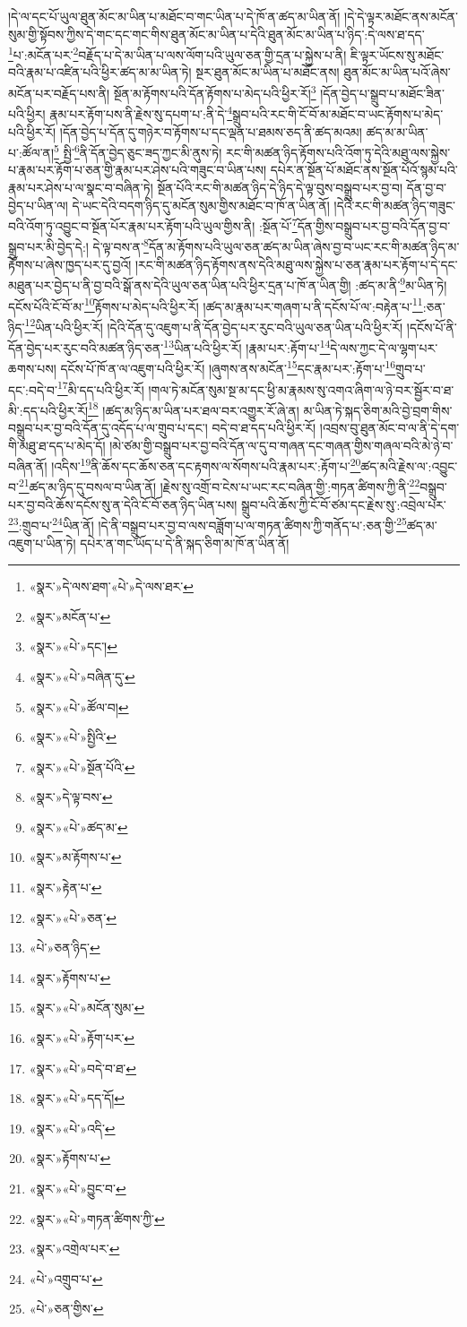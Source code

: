 །དེ་ལ་དང་པོ་ཡུལ་ཐུན་མོང་མ་ཡིན་པ་མཐོང་བ་གང་ཡིན་པ་དེ་ཁོ་ན་ཚད་མ་ཡིན་ནོ། །དེ་དེ་ལྟར་མཐོང་ནས་མངོན་སུམ་གྱི་སྟོབས་ཀྱིས་དེ་གང་དང་གང་གིས་ཐུན་མོང་མ་ཡིན་པ་དེའི་ཐུན་མོང་མ་ཡིན་པ་ཉིད་:དེ་ལས་ཐ་དད་\footnote{«སྣར་»དེ་ལས་ཐག་«པེ་»དེ་ལས་ཐར་}པ་:མངོན་པར་\footnote{«སྣར་»མངོན་པ་}བརྗོད་པ་དེ་མ་ཡིན་པ་ལས་ལོག་པའི་ཡུལ་ཅན་གྱི་དྲན་པ་སྐྱེས་པ་ནི། ཇི་ལྟར་ཡོངས་སུ་མཐོང་བའི་རྣམ་པ་འཛིན་པའི་ཕྱིར་ཚད་མ་མ་ཡིན་ཏེ། སྔར་ཐུན་མོང་མ་ཡིན་པ་མཐོང་ནས། ཐུན་མོང་མ་ཡིན་པའོ་ཞེས་མངོན་པར་བརྗོད་པས་ནི། སྔོན་མ་རྟོགས་པའི་དོན་རྟོགས་པ་མེད་པའི་ཕྱིར་རོ།\footnote{«སྣར་»«པེ་»དང་།} །དོན་བྱེད་པ་སྒྲུབ་པ་མཐོང་ཟིན་པའི་ཕྱིར། རྣམ་པར་རྟོག་པས་ནི་རྗེས་སུ་དཔག་པ་:ནི་དེ་\footnote{«སྣར་»«པེ་»བཞིན་དུ་}སྒྲུབ་པའི་རང་གི་ངོ་བོ་མ་མཐོང་བ་ཡང་རྟོགས་པ་མེད་པའི་ཕྱིར་རོ། །དོན་བྱེད་པ་དོན་དུ་གཉེར་བ་རྟོགས་པ་དང་ལྡན་པ་ཐམས་ཅད་ནི་ཚད་མའམ། ཚད་མ་མ་ཡིན་པ་:ཚོལ་ན།\footnote{«སྣར་»«པེ་»ཚོལ་བ།} སྤྱི་\footnote{«སྣར་»«པེ་»སྤྱིའི་}ནི་དོན་བྱེད་ཅུང་ཟད་ཀྱང་མི་ནུས་ཏེ། རང་གི་མཚན་ཉིད་རྟོགས་པའི་འོག་ཏུ་དེའི་མཐུ་ལས་སྐྱེས་པ་རྣམ་པར་རྟོག་པ་ཅན་གྱི་རྣམ་པར་ཤེས་པའི་གཟུང་བ་ཡིན་པས། དཔེར་ན་སྔོན་པོ་མཐོང་ནས་སྔོན་པོའོ་སྙམ་པའི་རྣམ་པར་ཤེས་པ་ལ་སྣང་བ་བཞིན་ཏེ། སྔོན་པོའི་རང་གི་མཚན་ཉིད་དེ་ཉིད་དེ་ལྟ་བུས་བསྒྲུབ་པར་བྱ་བ། དོན་བྱ་བ་བྱེད་པ་ཡིན་ལ། དེ་ཡང་དེའི་བདག་ཉིད་དུ་མངོན་སུམ་གྱིས་མཐོང་བ་ཁོ་ན་ཡིན་ནོ། །དེའི་རང་གི་མཚན་ཉིད་གཟུང་བའི་འོག་ཏུ་འབྱུང་བ་སྔོན་པོར་རྣམ་པར་རྟོག་པའི་ཡུལ་གྱིས་ནི། :སྔོན་པོ་\footnote{«སྣར་»«པེ་»སྔོན་པོའི་}དོན་གྱིས་བསྒྲུབ་པར་བྱ་བའི་དོན་བྱ་བ་སྒྲུབ་པར་མི་བྱེད་དེ:། དེ་ལྟ་བས་ན་\footnote{«སྣར་»དེ་ལྟ་བས་}དོན་མ་རྟོགས་པའི་ཡུལ་ཅན་ཚད་མ་ཡིན་ཞེས་བྱ་བ་ཡང་རང་གི་མཚན་ཉིད་མ་རྟོགས་པ་ཞེས་ཁྱད་པར་དུ་བྱའོ། །རང་གི་མཚན་ཉིད་རྟོགས་ནས་དེའི་མཐུ་ལས་སྐྱེས་པ་ཅན་རྣམ་པར་རྟོག་པ་དེ་དང་མཐུན་པར་བྱེད་པ་ནི་བྱ་བའི་སྒོ་ནས་དེའི་ཡུལ་ཅན་ཡིན་པའི་ཕྱིར་དྲན་པ་ཁོ་ན་ཡིན་གྱི། :ཚད་མ་ནི་\footnote{«སྣར་»«པེ་»ཚད་མ་}མ་ཡིན་ཏེ། དངོས་པོའི་ངོ་བོ་མ་\footnote{«སྣར་»མ་རྟོགས་པ་}རྟོགས་པ་མེད་པའི་ཕྱིར་རོ། །ཚད་མ་རྣམ་པར་གཞག་པ་ནི་དངོས་པོ་ལ་:བརྟེན་པ་\footnote{«སྣར་»རྟེན་པ་}:ཅན་ཉིད་\footnote{«སྣར་»«པེ་»ཅན་}ཡིན་པའི་ཕྱིར་རོ། །དེའི་དོན་དུ་འཇུག་པ་ནི་དོན་བྱེད་པར་རུང་བའི་ཡུལ་ཅན་ཡིན་པའི་ཕྱིར་རོ། །དངོས་པོ་ནི་དོན་བྱེད་པར་རུང་བའི་མཚན་ཉིད་ཅན་\footnote{«པེ་»ཅན་ཉིད་}ཡིན་པའི་ཕྱིར་རོ། །རྣམ་པར་:རྟོག་པ་\footnote{«སྣར་»རྟོགས་པ་}དེ་ལས་ཀྱང་དེ་ལ་ལྷག་པར་ཆགས་པས། དངོས་པོ་ཁོ་ན་ལ་འཇུག་པའི་ཕྱིར་རོ། །ཞུགས་ནས་མངོན་\footnote{«སྣར་»«པེ་»མངོན་སུམ་}དང་རྣམ་པར་:རྟོག་པ་\footnote{«སྣར་»«པེ་»རྟོག་པར་}གྲུབ་པ་དང་:བདེ་བ་\footnote{«སྣར་»«པེ་»བདེ་བ་ཐ་}མི་དད་པའི་ཕྱིར་རོ། །གལ་ཏེ་མངོན་སུམ་སྔ་མ་དང་ཕྱི་མ་རྣམས་སུ་འགའ་ཞིག་ལ་ཉེ་བར་སྦྱོར་བ་ཐ་མི་:དད་པའི་ཕྱིར་རོ།\footnote{«སྣར་»«པེ་»དད་དོ།} །ཚད་མ་ཉིད་མ་ཡིན་པར་ཐལ་བར་འགྱུར་རོ་ཞེ་ན། མ་ཡིན་ཏེ་སྐད་ཅིག་མའི་བྱེ་བྲག་གིས་བསྒྲུབ་པར་བྱ་བའི་དོན་དུ་འདོད་པ་ལ་གྲུབ་པ་དང་། བདེ་བ་ཐ་དད་པའི་ཕྱིར་རོ། །འབྲས་བུ་ཐུན་མོང་བ་ལ་ནི་དེ་དག་གི་མཐུ་ཐ་དད་པ་མེད་དོ། །མེ་ཙམ་གྱི་བསྒྲུབ་པར་བྱ་བའི་དོན་ལ་དུ་བ་གཞན་དང་གཞན་གྱིས་གཞལ་བའི་མེ་ཉེ་བ་བཞིན་ནོ། །འདིས་\footnote{«སྣར་»«པེ་»འདི་}ནི་ཆོས་དང་ཆོས་ཅན་དང་རྟགས་ལ་སོགས་པའི་རྣམ་པར་:རྟོག་པ་\footnote{«སྣར་»རྟོགས་པ་}ཚད་མའི་རྗེས་ལ་:འབྱུང་བ་\footnote{«སྣར་»«པེ་»བྱུང་བ་}ཚད་མ་ཉིད་དུ་བསལ་བ་ཡིན་ནོ། །རྗེས་སུ་འགྲོ་བ་ངེས་པ་ཡང་རང་བཞིན་གྱི་:གཏན་ཚིགས་ཀྱི་ནི་\footnote{«སྣར་»«པེ་»གཏན་ཚིགས་ཀྱི་}བསྒྲུབ་པར་བྱ་བའི་ཆོས་དངོས་སུ་ན་དེའི་ངོ་བོ་ཅན་ཉིད་ཡིན་པས། སྒྲུབ་པའི་ཆོས་ཀྱི་ངོ་བོ་ཙམ་དང་རྗེས་སུ་:འབྲེལ་པར་\footnote{«སྣར་»འགྲེལ་པར་}:གྲུབ་པ་\footnote{«པེ་»འགྲུབ་པ་}ཡིན་ནོ། །དེ་ནི་བསྒྲུབ་པར་བྱ་བ་ལས་བཟློག་པ་ལ་གཏན་ཚིགས་ཀྱི་གནོད་པ་:ཅན་གྱི་\footnote{«པེ་»ཅན་གྱིས་}ཚད་མ་འཇུག་པ་ཡིན་ཏེ། དཔེར་ན་གང་ཡོད་པ་དེ་ནི་སྐད་ཅིག་མ་ཁོ་ན་ཡིན་ནོ། 